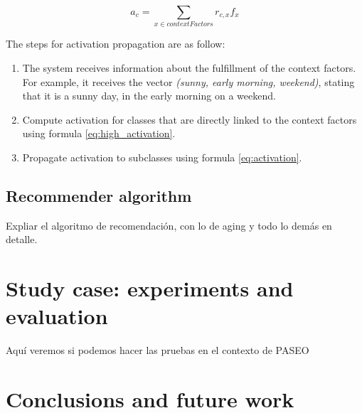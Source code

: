 \documentclass{article}
\begin{document}
\begin{equation} \label{eq:high_activation}
    a_c = \sum_{x \in contextFactors} r_{c,x} f_x
\end{equation}

The steps for activation propagation are as follow:
\begin{enumerate}
    \item The system receives information about the fulfillment of the context factors. For example, it receives the vector \textit{(sunny, early morning, weekend)}, stating that it is a sunny day, in the early morning on a weekend.
    
    \item Compute activation for classes that are directly linked to the context factors using formula \ref{eq:high_activation}.
    
    \item Propagate activation to subclasses using formula \ref{eq:activation}.
\end{enumerate}

\subsection{Recommender algorithm}

Expliar el algoritmo de recomendación, con lo de aging y todo lo demás en detalle.

\section{Study case: experiments and evaluation}
Aquí veremos si podemos hacer las pruebas en el contexto de PASEO

\section{Conclusions and future work}

\medskip
 
\printbibliography
\end{document}
